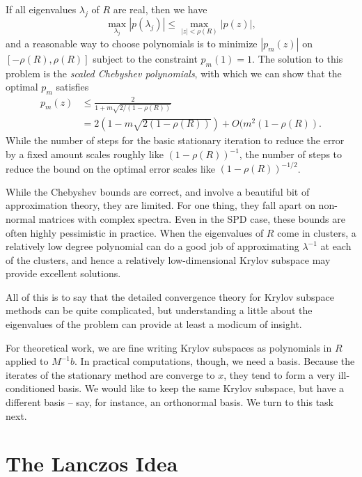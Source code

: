 \documentclass[12pt, leqno]{article}
\begin{document}
If all eigenvalues $\lambda_j$ of $R$ are real, then we have
\[
  \max_{\lambda_j} |p(\lambda_j)| \leq \max_{|z|<\rho(R)} |p(z)|,
\]
and a reasonable way to choose polynomials is to minimize $|p_m(z)|$
on $[-\rho(R),\rho(R)]$ subject to the constraint $p_m(1) = 1$.  The
solution to this problem is the {\em scaled Chebyshev polynomials},
with which we can show that the optimal $p_m$ satisfies
\begin{align*}
  p_m(z)
  & \leq \frac{2}{1+m\sqrt{2/(1-\rho(R))}} \\
  & = 2(1-m\sqrt{2(1-\rho(R))}) + O(m^2(1-\rho(R)).
\end{align*}
While the number of steps for the basic stationary iteration to
reduce the error by a fixed amount scales roughly like
$(1-\rho(R))^{-1}$, the number of steps to reduce the bound on the
optimal error scales like $(1-\rho(R))^{-1/2}$.

While the Chebyshev bounds are correct, and involve a beautiful bit of
approximation theory, they are limited.  For one thing, they fall
apart on non-normal matrices with complex spectra.  Even in the SPD
case, these bounds are often highly pessimistic in practice.  When the
eigenvalues of $R$ come in clusters, a relatively low degree
polynomial can do a good job of approximating $\lambda^{-1}$ at each
of the clusters, and hence a relatively low-dimensional Krylov
subspace may provide excellent solutions.

All of this is to say that the detailed convergence theory for Krylov
subspace methods can be quite complicated, but understanding a little
about the eigenvalues of the problem can provide at least a modicum of
insight.

For theoretical work, we are fine writing Krylov subspaces as
polynomials in $R$ applied to $M^{-1} b$.  In practical computations,
though, we need a basis.  Because the iterates of the stationary
method are converge to $x$, they tend to form a very ill-conditioned
basis.  We would like to keep the same Krylov subspace, but have a
different basis -- say, for instance, an orthonormal basis.  We turn
to this task next.

\section{The Lanczos Idea}
\end{document}
